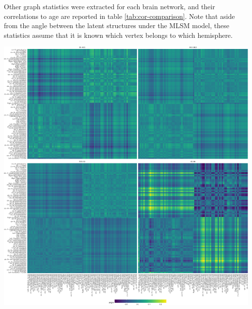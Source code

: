 \documentclass[12pt]{article}
\begin{document}
Other graph statistics were extracted for each brain network, and their
correlations to age are reported in table \ref{tab:cor-comparison}. Note
that aside from the angle between the latent structures under the MLSM
model, these statistics assume that it is known which vertex belongs to
which hemisphere.

\begin{center}\includegraphics[width=1\linewidth]{draft_files/figure-latex/cosine-heatmap-1} \end{center}
\end{document}
